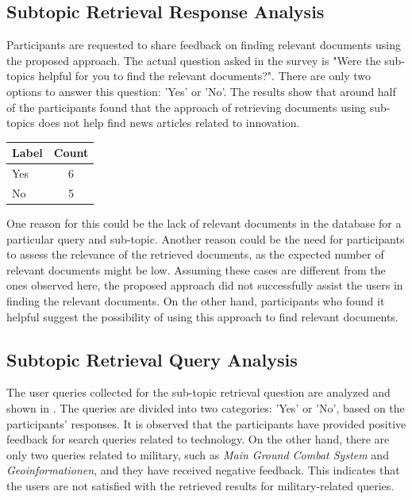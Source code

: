 \subsection{Subtopic Retrieval Response Analysis}

Participants are requested to share feedback on finding relevant documents using the proposed approach. The actual question asked in the survey is "Were the sub-topics helpful for you to find the relevant documents?". There are only two options to answer this question: 'Yes' or 'No'. The results show that around half of the participants found that the approach of retrieving documents using sub-topics does not help find news articles related to innovation.



\begin{center}
	\label{tab:question_5_results}
	\begin{tabularx}{.3\textwidth}{|Y|c|}
		\hline
		Label & Count \\
		\hline
		Yes & 6 \\
		\hline
		No & 5 \\
		\hline
	\end{tabularx}
\end{center} 

One reason for this could be the lack of relevant documents in the database for a particular query and sub-topic. Another reason could be the need for participants to assess the relevance of the retrieved documents, as the expected number of relevant documents might be low. Assuming these cases are different from the ones observed here, the proposed approach did not successfully assist the users in finding the relevant documents. On the other hand, participants who found it helpful suggest the possibility of using this approach to find relevant documents.

\subsection{Subtopic Retrieval Query Analysis}

The user queries collected for the sub-topic retrieval question are analyzed and shown in . The queries are divided into two categories: 'Yes' or 'No', based on the participants' responses. It is observed that the participants have provided positive feedback for search queries related to technology. On the other hand, there are only two queries related to military, such as \emph{Main Ground Combat System} and \emph{Geoinformationen}, and they have received negative feedback. This indicates that the users are not satisfied with the retrieved results for military-related queries.

